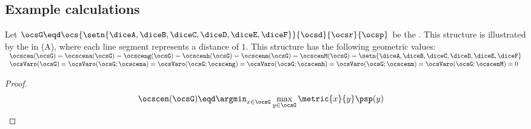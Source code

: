 \subsection{Example calculations}
\begin{tabstr}{0.75}
\begin{example}%
\label{ex:fairdie}
Let $\ocsG\eqd\ocs{\setn{\diceA,\diceB,\diceC,\diceD,\diceE,\diceF}}{\ocsd}{\ocsr}{\ocsp}$ 
be the  .
This structure is illustrated by the   in  (A), %
where each line segment represents a distance of $1$.
%
This structure has the following geometric values:
  \\\indentx$\begin{array}{l}
      \ocscen(\ocsG)=\ocscena(\ocsG)=\ocsceng(\ocsG)=\ocscenh(\ocsG)=\ocscenm(\ocsG)=\ocscenM(\ocsG)  
         = \setn{\diceA,\diceB,\diceC,\diceD,\diceE,\diceF} %
    \\\ocsVaro(\ocsG) = \ocsVaro(\ocsG;\ocscena) = \ocsVaro(\ocsG;\ocsceng) = \ocsVaro(\ocsG;\ocscenh) = \ocsVaro(\ocsG;\ocscenm) = \ocsVaro(\ocsG;\ocscenM)  =  0     
  \end{array}$
\end{example}
\begin{proof}
\begin{align*}
  \ocscen(\ocsG)
    &\eqd \argmin_{x\in\ocsG}\max_{y\in\ocsG}\metric{x}{y}\psp(y)

\end{align*}
\end{proof}
\end{tabstr}

